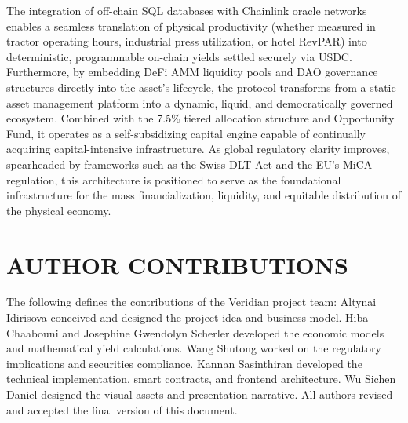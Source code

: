 \documentclass{Resources/bdlt-project}
\begin{document}
The integration of off-chain SQL databases with Chainlink oracle networks enables a seamless translation of physical productivity (whether measured in tractor operating hours, industrial press utilization, or hotel RevPAR) into deterministic, programmable on-chain yields settled securely via USDC. Furthermore, by embedding DeFi AMM liquidity pools and DAO governance structures directly into the asset's lifecycle, the protocol transforms from a static asset management platform into a dynamic, liquid, and democratically governed ecosystem. Combined with the 7.5\% tiered allocation structure and Opportunity Fund, it operates as a self-subsidizing capital engine capable of continually acquiring capital-intensive infrastructure. As global regulatory clarity improves, spearheaded by frameworks such as the Swiss DLT Act and the EU's MiCA regulation, this architecture is positioned to serve as the foundational infrastructure for the mass financialization, liquidity, and equitable distribution of the physical economy.

\section{AUTHOR CONTRIBUTIONS}
The following defines the contributions of the Veridian project team:
Altynai Idirisova conceived and designed the project idea and business model. Hiba Chaabouni and Josephine Gwendolyn Scherler developed the economic models and mathematical yield calculations. Wang Shutong worked on the regulatory implications and securities compliance. Kannan Sasinthiran developed the technical implementation, smart contracts, and frontend architecture. Wu Sichen Daniel designed the visual assets and presentation narrative. All authors revised and accepted the final version of this document.

\printbibliography
\end{document}
